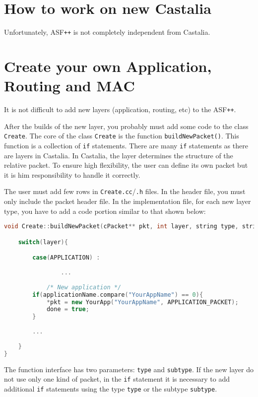 \section{How to work on new Castalia}
Unfortunately, ASF\texttt{++} is not completely independent from Castalia. %

\section{Create your own Application, Routing and MAC}
\label{sec:updateCastalia}
It is not difficult to add new layers (application, routing, etc) to the ASF\texttt{++}. 

After the builds of the new layer, you probably must add some code to the class \texttt{Create}. The core of the class \texttt{Create} is the function  \texttt{buildNewPacket()}. This function is a collection of \texttt{if} statements. There are many \texttt{if} statements as there are layers in Castalia. In Castalia, the layer determines the structure of the relative packet. To ensure high flexibility, the user can define its own packet but it is him responsibility to handle it correctly.

The user must add few rows in \texttt{Create.cc}/\texttt{.h} files. In the header file, you must only include the packet header file. In the implementation file, for each new layer type, you have to add a code portion similar to that shown below:
%
\begin{lstlisting}[language={cpp}]
void Create::buildNewPacket(cPacket** pkt, int layer, string type, string subtype){  

	switch(layer){

		case(APPLICATION) :  
	
        		...
	
         	/* New application */
		if(applicationName.compare("YourAppName") == 0){
			*pkt = new YourApp("YourAppName", APPLICATION_PACKET);
			done = true;
		}
            
		...
            
	}
}
\end{lstlisting}

The function interface has two parameters: \texttt{type} and \texttt{subtype}. If the new layer do not use  only one kind of packet, in the \texttt{if} statement it is necessary to add additional \texttt{if} statements using the type \texttt{type} or the subtype \texttt{subtype}.

